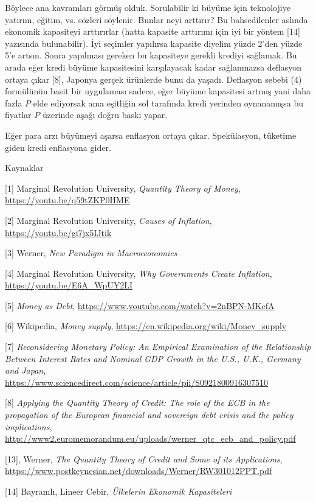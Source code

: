 \documentclass[12pt,fleqn]{article}\usepackage{../../common}
\begin{document}
Böylece ana kavramları görmüş olduk. Sorulabilir ki büyüme için teknolojiye
yatırım, eğitim, vs. sözleri söylenir. Bunlar neyi arttırır? Bu
bahsedilenler aslında ekonomik kapasiteyi arttırırlar (hatta kapasite
arttırımı için iyi bir yöntem [14] yazısında bulunabilir). İyi seçimler
yapılırsa kapasite diyelim yüzde 2'den yüzde 5'e artsın. Sonra yapılması
gereken bu kapasiteye gerekli krediyi sağlamak. Bu arada eğer kredi büyüme
kapasitesini karşılayacak kadar sağlanmazsa deflasyon ortaya çıkar [8],
Japonya gerçek ürünlerde bunu da yaşadı.  Deflasyon sebebi (4) formülünün
basit bir uygulaması sadece, eğer büyüme kapasitesi artmış yani daha fazla
$P$ elde ediyorsak ama eşitliğin sol tarafında kredi yerinden oynanamışsa
bu fiyatlar $P$ üzerinde aşağı doğru baskı yapar.

Eğer para arzı büyümeyi aşarsa enflasyon ortaya çıkar. Spekülasyon,
tüketime giden kredi enflasyona gider.



Kaynaklar

[1] Marginal Revolution University, {\em Quantity Theory of Money}, 
    \url{https://youtu.be/q59tZKP0HME}

[2] Marginal Revolution University, {\em Causes of Inflation}, 
    \url{https://youtu.be/gi7jx5IJtik}

[3] Werner, {\em New Paradigm in Macroeconomics}

[4] Marginal Revolution University, {\em Why Governments Create Inflation}, 
    \url{https://youtu.be/E6A_WpUY2LI}

[5] {\em Money as Debt}, 
    \url{https://www.youtube.com/watch?v=2nBPN-MKefA}

[6] Wikipedia, {\em Money supply}, 
    \url{https://en.wikipedia.org/wiki/Money_supply}

[7] {\em Reconsidering Monetary Policy: An Empirical Examination of the Relationship Between Interest Rates and Nominal GDP Growth in the U.S., U.K., Germany and Japan},
    \url{https://www.sciencedirect.com/science/article/pii/S0921800916307510}

[8] {\em Applying the Quantity Theory of Credit: The role of the ECB in the propagation of the European financial and sovereign debt crisis and the policy implications}, 
   \url{http://www2.euromemorandum.eu/uploads/werner_qtc_ecb_and_policy.pdf}

[13], Werner, {\em The Quantity Theory of Credit and Some of its Applications}, 
     \url{https://www.postkeynesian.net/downloads/Werner/RW301012PPT.pdf}

[14] Bayramlı, Lineer Cebir, {\em Ülkelerin Ekonomik  Kapasiteleri}
\end{document}
